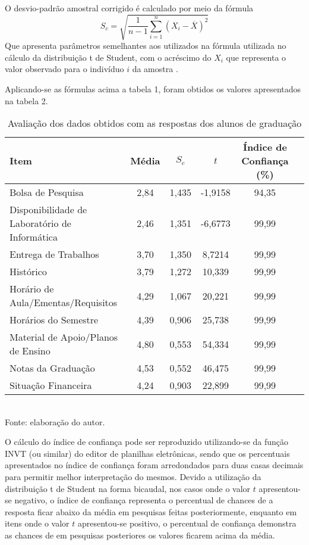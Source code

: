 O desvio-padrão amostral corrigido é calculado por meio da fórmula 
\[
   S_c = \sqrt{\frac{1}{n-1} \sum_{i=1}^n(X_i - \overline{X})^2} 
\]
Que apresenta parâmetros semelhantes aos utilizados na fórmula utilizada no cálculo da distribuição t de Student, com o acréscimo do $X_i$ que representa o valor observado para o indivíduo $i$ da amostra
\cite{DistroStudent}.

Aplicando-se as fórmulas acima a tabela 1, foram obtidos os valores apresentados na tabela 2.

\begin{table}[!hbt]
\centering
\caption[Avaliação dos dados obtidos - Graduação]{Avaliação dos dados obtidos com as respostas dos alunos de graduação}
\vspace{3mm}
\begin{tabular}{|p{5cm}|c|c|c|c|c|}\hline
\textbf{Item} & \textbf{Média} & \textbf{$S_c$} & \textbf{$t$} & \textbf{Índice de Confiança (\%)} \\ \hline
Bolsa de Pesquisa & 2,84 & 1,435 & -1,9158 & 94,35 \\ \hline
Disponibilidade de Laboratório de Informática & 2,46 & 1,351 & -6,6773 & 99,99 \\ \hline
Entrega de Trabalhos & 3,70 & 1,350 & 8,7214 & 99,99 \\ \hline
Histórico & 3,79 & 1,272 & 10,339 & 99,99 \\ \hline
Horário de Aula/Ementas/Requisitos & 4,29 & 1,067 & 20,221 & 99,99  \\ \hline
Horários do Semestre & 4,39 & 0,906 & 25,738 & 99,99 \\ \hline
Material de Apoio/Planos de Ensino & 4,80 & 0,553 & 54,334 & 99,99 \\ \hline
Notas da Graduação & 4,53 & 0,552 & 46,475 & 99,99 \\ \hline
Situação Financeira & 4,24 & 0,903 & 22,899 & 99,99 \\ \hline
\end{tabular}
\\ Fonte: elaboração do autor.
\end{table}

O cálculo do índice de confiança pode ser reproduzido utilizando-se da função INVT (ou similar) do editor de planilhas eletrônicas, sendo que os percentuais apresentados no índice de confiança foram arredondados para duas casas decimais para permitir melhor interpretação do mesmos. 
Devido a utilização da  distribuição t de Student na forma bicaudal, nos casos onde o valor $t$ apresentou-se negativo, o índice de confiança representa o percentual de chances de a resposta ficar abaixo da média em pesquisas feitas posteriormente, enquanto em itens onde o valor $t$ apresentou-se positivo, o percentual de confiança demonstra as chances de em pesquisas posteriores os valores ficarem acima da média.

